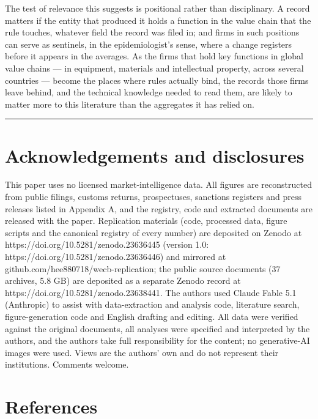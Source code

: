 \documentclass[12pt]{article}
\begin{document}
The test of relevance this suggests is positional rather than disciplinary. A record matters if the entity that produced it holds a function in the value chain that the rule touches, whatever field the record was filed in; and firms in such positions can serve as sentinels, in the epidemiologist's sense, where a change registers before it appears in the averages. As the firms that hold key functions in global value chains --- in equipment, materials and intellectual property, across several countries --- become the places where rules actually bind, the records those firms leave behind, and the technical knowledge needed to read them, are likely to matter more to this literature than the aggregates it has relied on.

\begin{center}\rule{0.5\linewidth}{0.5pt}\end{center}

\section*{Acknowledgements and disclosures}

This paper uses no licensed market-intelligence data. All figures are reconstructed from public filings, customs returns, prospectuses, sanctions registers and press releases listed in Appendix A, and the registry, code and extracted documents are released with the paper. Replication materials (code, processed data, figure scripts and the canonical registry of every number) are deposited on Zenodo at https://doi.org/10.5281/zenodo.23636445 (version 1.0: https://doi.org/10.5281/zenodo.23636446) and mirrored at github.com/hee880718/wecb-replication; the public source documents (37 archives, 5.8 GB) are deposited as a separate Zenodo record at https://doi.org/10.5281/zenodo.23638441. The authors used Claude Fable 5.1 (Anthropic) to assist with data-extraction and analysis code, literature search, figure-generation code and English drafting and editing. All data were verified against the original documents, all analyses were specified and interpreted by the authors, and the authors take full responsibility for the content; no generative-AI images were used. Views are the authors' own and do not represent their institutions. Comments welcome.

\clearpage\section*{References}\begingroup\footnotesize{}
\end{document}
